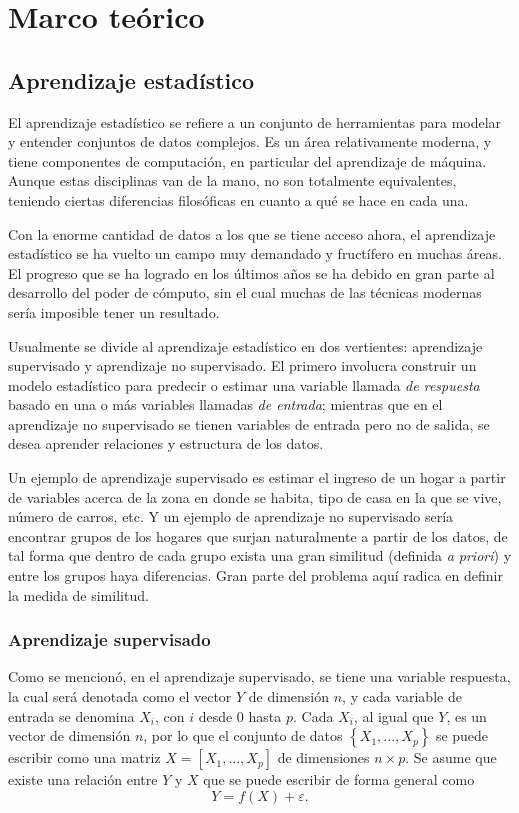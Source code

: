 \chapter{Marco teórico}

\section{Aprendizaje estadístico}

El aprendizaje estadístico se refiere a un conjunto de herramientas para modelar y entender conjuntos de datos complejos. Es un área relativamente moderna, y tiene componentes de computación, en particular del aprendizaje de máquina. Aunque estas disciplinas van de la mano, no son totalmente equivalentes, teniendo ciertas diferencias filosóficas en cuanto a qué se hace en cada una.

Con la enorme cantidad de datos a los que se tiene acceso ahora, el aprendizaje estadístico se ha vuelto un campo muy demandado y fructífero en muchas áreas. El progreso que se ha logrado en los últimos años se ha debido en gran parte al desarrollo del poder de cómputo, sin el cual muchas de las técnicas modernas sería imposible tener un resultado.

Usualmente se divide al aprendizaje estadístico en dos vertientes: aprendizaje supervisado y aprendizaje no supervisado. El primero involucra construir un modelo estadístico para predecir o estimar una variable llamada \textit{de respuesta} basado en una o más variables llamadas \textit{de entrada}; mientras que en el aprendizaje no supervisado se tienen variables de entrada pero no de salida, se desea aprender relaciones y estructura de los datos.

Un ejemplo de aprendizaje supervisado es estimar el ingreso de un hogar a partir de variables acerca de la zona en donde se habita, tipo de casa en la que se vive, número de carros, etc. Y un ejemplo de aprendizaje no supervisado sería encontrar grupos de los hogares que surjan naturalmente a partir de los datos, de tal forma que dentro de cada grupo exista una gran similitud (definida \textit{a priori}) y entre los grupos haya diferencias. Gran parte del problema aquí radica en definir la medida de similitud.

\subsection{Aprendizaje supervisado}

Como se mencionó, en el aprendizaje supervisado, se tiene una variable respuesta, la cual será denotada como el vector $Y$ de dimensión $n$, y cada variable de entrada se denomina $X_i$, con $i$ desde $0$ hasta $p$. Cada $X_i$, al igual que $Y$, es un vector de dimensión $n$, por lo que el conjunto de datos $\left \{ X_1, ..., X_p \right \}$ se puede escribir como una matriz  $X = \left[ X_1, ..., X_p \right ]$ de dimensiones $n \times p$. Se asume que existe una relación entre $Y$ y $X$ que se puede escribir de forma general como
$$Y = f(X) + \varepsilon.$$

